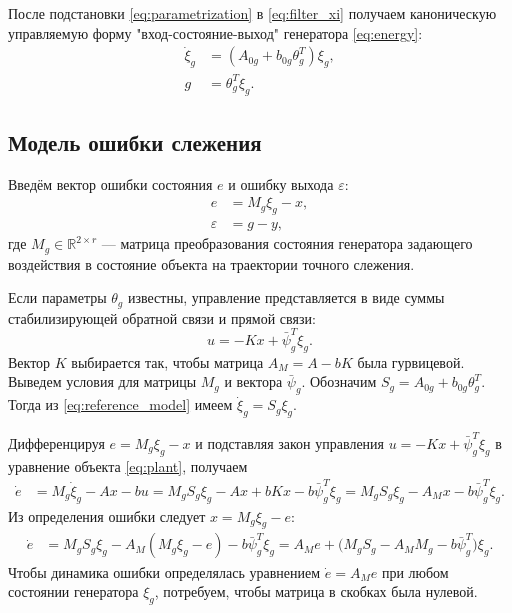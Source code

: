 После подстановки \eqref{eq:parametrization} в \eqref{eq:filter_xi} получаем каноническую
управляемую форму "вход-состояние-выход" генератора \eqref{eq:energy}:
\begin{equation}
\begin{aligned}
    \dot{\xi}_g &= \left(A_{0g}+b_{0g}\theta_g^T\right)\xi_g, \\
    g &= \theta_g^T\xi_g.
\end{aligned}
\label{eq:reference_model}
\end{equation}

\subsection{Модель ошибки слежения}

Введём вектор ошибки состояния $e$ и ошибку выхода $\varepsilon$:
\begin{align}
    e &= M_g\xi_g-x, \label{eq:state_error_def}\\
    \varepsilon &= g-y, \label{eq:output_error_def}
\end{align}
где $M_g\in\mathbb{R}^{2\times r}$ --- матрица преобразования
состояния генератора задающего воздействия в состояние объекта
на траектории точного слежения.

Если параметры $\theta_g$ известны, управление представляется
в виде суммы стабилизирующей обратной связи и прямой связи:
\[
    u=-Kx+\bar{\psi}_g^T\xi_g.
\]
Вектор $K$ выбирается так, чтобы матрица $A_M=A-bK$ была гурвицевой.
Выведем условия для матрицы $M_g$ и вектора $\bar{\psi}_g$.
Обозначим $S_g=A_{0g}+b_{0g}\theta_g^T$. Тогда из
\eqref{eq:reference_model} имеем $\dot{\xi}_g=S_g\xi_g$.

Дифференцируя $e=M_g\xi_g-x$ и подставляя закон управления
$u=-Kx+\bar{\psi}_g^T\xi_g$ в уравнение объекта \eqref{eq:plant},
получаем
\begin{align*}
    \dot e
    &= M_g\dot{\xi}_g-Ax-bu= M_gS_g\xi_g-Ax+bKx-b\bar{\psi}_g^T\xi_g= M_gS_g\xi_g-A_Mx-b\bar{\psi}_g^T\xi_g.
\end{align*}
Из определения ошибки следует $x=M_g\xi_g-e$:
\begin{align*}
    \dot e
    &= M_gS_g\xi_g-A_M(M_g\xi_g-e)-b\bar{\psi}_g^T\xi_g= A_Me+
       \bigl(M_gS_g-A_MM_g-b\bar{\psi}_g^T\bigr)\xi_g.
\end{align*}
Чтобы динамика ошибки определялась уравнением $\dot e=A_Me$
при любом состоянии генератора $\xi_g$, потребуем, чтобы матрица
в скобках была нулевой.


